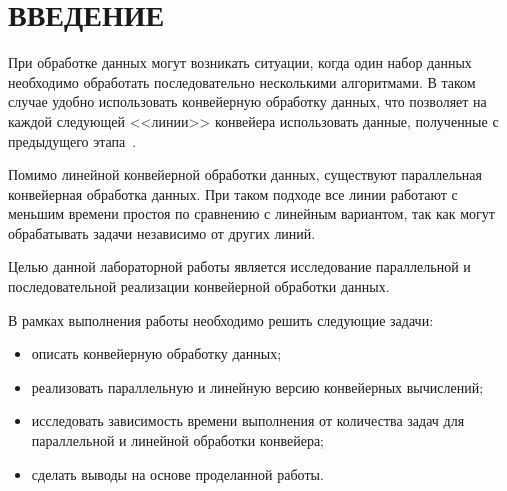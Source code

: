 \chapter*{\hfill{\centering ВВЕДЕНИЕ}\hfill}

При обработке данных могут возникать ситуации, когда один набор данных необходимо обработать последовательно несколькими алгоритмами.
В таком случае удобно использовать конвейерную обработку данных, что позволяет на каждой следующей <<линии>> конвейера использовать данные, полученные с предыдущего этапа~\cite{conveyer-opr}.

Помимо линейной конвейерной обработки данных, существуют параллельная конвейерная обработка данных.
При таком подходе все линии работают с меньшим времени простоя по сравнению с линейным вариантом, так как могут обрабатывать задачи независимо от других линий.

Целью данной лабораторной работы является исследование параллельной и последовательной реализации конвейерной обработки данных.

В рамках выполнения работы необходимо решить следующие задачи:

\begin{itemize}
	\item описать конвейерную обработку данных;
	\item реализовать параллельную и линейную версию конвейерных вычислений;
	\item исследовать зависимость времени выполнения от количества задач для параллельной и линейной обработки конвейера;
	\item сделать выводы на основе проделанной работы.
\end{itemize}
